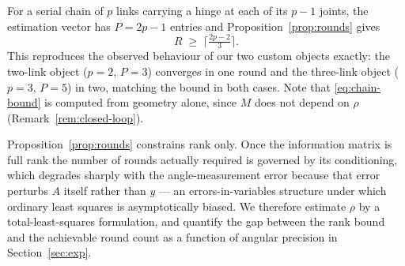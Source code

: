 For a serial chain of $p$ links carrying a hinge at each of its $p-1$ joints,
the estimation vector has $P=2p-1$ entries and Proposition~\ref{prop:rounds}
gives
%
\begin{equation}
R\;\ge\;\Big\lceil \tfrac{2p-2}{3}\Big\rceil .
\label{eq:chain-bound}
\end{equation}
%
This reproduces the observed behaviour of our two custom objects exactly: the
two-link object ($p=2$, $P=3$) converges in one round and the three-link object
($p=3$, $P=5$) in two, matching the bound in both cases. Note that
\eqref{eq:chain-bound} is computed from geometry alone, since $M$ does not
depend on $\rho$ (Remark~\ref{rem:closed-loop}).

\begin{remark}
\label{rem:conditioning}
Proposition~\ref{prop:rounds} constrains rank only. Once the information matrix
is full rank the number of rounds actually required is governed by its
conditioning, which degrades sharply with the angle-measurement error because
that error perturbs $A$ itself rather than $y$ --- an errors-in-variables
structure under which ordinary least squares is asymptotically biased. We
therefore estimate $\rho$ by a total-least-squares formulation, and quantify
the gap between the rank bound and the achievable round count as a function of
angular precision in Section~\ref{sec:exp}.
\end{remark}
